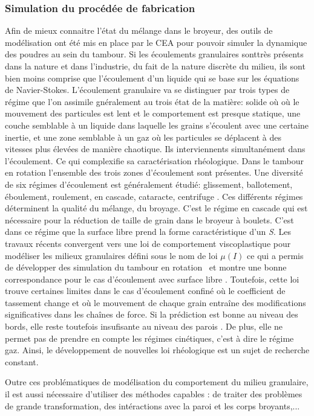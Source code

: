 \subsubsection*{Simulation du procédée de fabrication}

Afin de mieux connaitre l'état du mélange dans le broyeur, des outils de modélisation ont été mis en place par le CEA pour pouvoir simuler la dynamique des poudres au sein du tambour. Si les écoulements granulaires sonttrès présents dans la nature et dans l'industrie, du fait de la nature discrète du milieu, ils sont bien moins comprise que l'écoulement d'un liquide qui se base sur les équations de Navier-Stokes.
L'écoulement granulaire va se distinguer par trois types de régime que l'on assimile gnéralement au trois état de la matière: solide où où le mouvement des particules est lent et le comportement est presque statique, une couche semblable à un liquide dans laquelle les grains s'écoulent avec une certaine inertie, et une zone semblable à un gaz où les particules se déplacent à des vitesses plus élevées de manière chaotique. Ils interviennents simultanément dans l'écoulement. Ce qui complexifie sa caractérisation rhéologique.
Dans le tambour en rotation l'ensemble des trois zones d'écoulement sont présentes. Une diversité de six régimes d'écoulement est généralement étudié: glissement, ballotement, éboulement, roulement, en cascade, cataracte,  centrifuge \cite{MELLMANN2001251}.
Ces différents régimes déterminent la qualité du mélange, du broyage.
C'est le régime en cascade qui est nécessaire pour la réduction de taille de grain dans le broyeur à boulets. C'est dans ce régime que la surface libre prend la forme caractéristique d'un \textit{S}.
Les travaux récents convergent vers une loi de comportement viscoplastique pour modéliser les milieux granulaires défini sous le nom de loi $\mu(I)$ \cite{gdr_midi_dense_2004,jop_constitutive_2006} ce qui a permis de développer des simulation du tambour en rotation~\cite{Cortet_2009} et montre une bonne correspondance pour le cas d'écoulement avec surface libre \cite{chou_cross-sectional_2009}.
Toutefois, cette loi trouve certaines limites dans le cas d'écoulement confiné où le coefficient de tassement change et où le mouvement de chaque grain entraîne des modifications significatives dans les chaînes de force. Si la prédiction est bonne au niveau des bords, elle reste toutefois insufisante au niveau des parois \cite{Rognon_Miller_Metzger_Einav_2015}. De plus, elle ne permet pas de prendre en compte les régimes cinétiques, c'est à dire le régime gaz. Ainsi, le développement de nouvelles loi rhéologique est un sujet de recherche constant.

Outre ces problématiques de modélisation du comportement du milieu granulaire, il est aussi nécessaire d'utiliser des méthodes capables : de traiter des problèmes de grande transformation, des intéractions avec la paroi et les corps broyants,...



